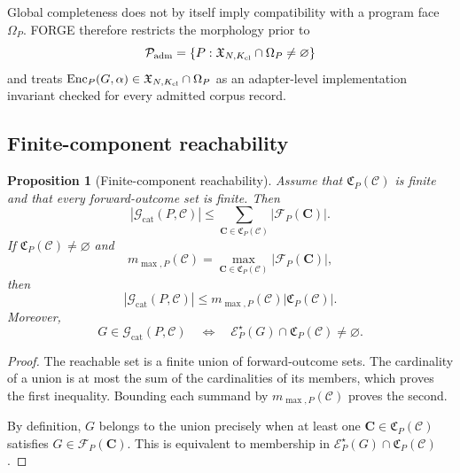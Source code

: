\documentclass{article}
\newtheorem{proposition}[theorem]{Proposition}
\begin{document}
Global completeness does not by itself imply compatibility with a program face $\Omega_P$.
FORGE therefore restricts the morphology prior to
\begin{equation}
 \mathcal P_{\rm adm}=\{P:\mathfrak X_{N,K_{\rm cl}}\cap\Omega_P\neq\varnothing\}
\end{equation}
and treats
$\operatorname{Enc}_P(G,\alpha)\in\mathfrak X_{N,K_{\rm cl}}\cap\Omega_P$ as an adapter-level
implementation invariant checked for every admitted corpus record.

\subsection{Finite-component reachability}

\begin{proposition}[Finite-component reachability]
\label{prop:catalogue-bound}
Assume that $\mathfrak C_P(\mathcal C)$ is finite and that every forward-outcome set is finite.
Then
\begin{equation}
    \left|
        \mathcal{G}_{\mathrm{cat}}(P,\mathcal C)
    \right|
    \leq
    \sum_{\mathbf C\in\mathfrak C_P(\mathcal C)}
    \left|\mathcal{F}_P(\mathbf C)\right|.
\end{equation}
If $\mathfrak C_P(\mathcal C)\neq\varnothing$ and
\begin{equation}
    m_{\max,P}(\mathcal C)
    =
    \max_{\mathbf C\in\mathfrak C_P(\mathcal C)}
    \left|\mathcal{F}_P(\mathbf C)\right|,
\end{equation}
then
\begin{equation}
    \left|
        \mathcal{G}_{\mathrm{cat}}(P,\mathcal C)
    \right|
    \leq
    m_{\max,P}(\mathcal C)
    \left|\mathfrak C_P(\mathcal C)\right|.
\end{equation}
Moreover,
\begin{equation}
    G\in\mathcal{G}_{\mathrm{cat}}(P,\mathcal C)
    \quad\Longleftrightarrow\quad
    \mathcal{E}^{\star}_P(G)
    \cap
    \mathfrak C_P(\mathcal C)
    \neq\varnothing.
\end{equation}
\end{proposition}

\begin{proof}
The reachable set is a finite union of forward-outcome sets.
The cardinality of a union is at most the sum of the cardinalities of its members, which proves the
first inequality.
Bounding each summand by $m_{\max,P}(\mathcal C)$ proves the second.

By definition, $G$ belongs to the union precisely when at least one
$\mathbf C\in\mathfrak C_P(\mathcal C)$ satisfies $G\in\mathcal F_P(\mathbf C)$.
This is equivalent to membership in
$\mathcal E_P^\star(G)\cap\mathfrak C_P(\mathcal C)$.
\end{proof}
\end{document}
